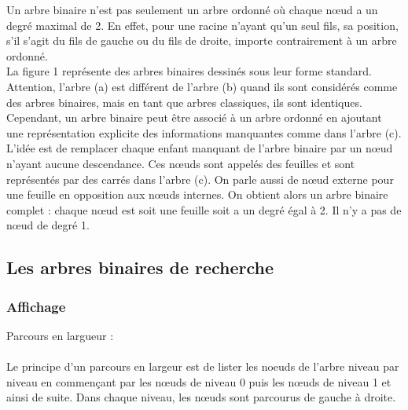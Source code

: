 \documentclass{report}
\begin{document}
\begin{center}
\label{fig1}
\end{center} 

Un arbre binaire n'est pas seulement un arbre ordonné où chaque nœud a un degré maximal de 2.  En effet, pour une racine n'ayant qu'un seul fils, sa position, s'il s'agit du fils de gauche ou du fils de droite, importe contrairement à un arbre ordonné.\\
La figure 1 représente des arbres binaires dessinés sous leur forme standard. Attention, l'arbre (a) est différent de l'arbre (b) quand ils sont considérés comme des arbres binaires, mais en tant que arbres classiques, ils sont identiques.\\
Cependant, un arbre binaire peut être associé à un arbre ordonné en ajoutant une représentation explicite des informations manquantes comme dans l'arbre (c). L'idée est de remplacer chaque enfant manquant de l'arbre binaire par un nœud n'ayant aucune descendance. Ces nœuds sont appelés des feuilles et sont représentés par des carrés dans l'arbre (c). On parle aussi de nœud externe pour une feuille en opposition aux nœuds internes. On obtient alors un arbre binaire complet : chaque nœud est soit une feuille soit a un degré égal à 2. Il n'y a pas de nœud de degré 1.\\


\subsection{Les arbres binaires de recherche}
\subsubsection{Affichage}

Parcours en largueur : \\
~\\
Le principe d'un parcours en largeur est de lister les noeuds de l'arbre niveau par niveau en commençant par les nœuds de niveau 0 puis les nœuds de niveau 1 et ainsi de suite. Dans chaque niveau, les nœuds sont parcourus de gauche à droite.\\ 

\end{document}
